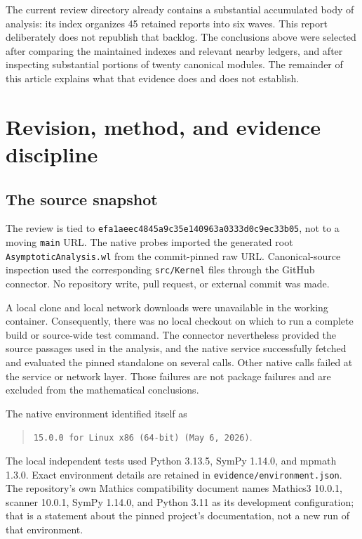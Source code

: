 \documentclass[11pt,a4paper]{article}
\newcommand{\code}[1]{\nolinkurl{#1}}
\newcommand{\commit}{\texttt{efa1aeec4845a9c35e140963a0333d0c9ec33b05}}
\begin{document}
The current review directory already contains a substantial accumulated body
of analysis: its index organizes 45 retained reports into six waves. This
report deliberately does not republish that backlog. The conclusions above
were selected after comparing the maintained indexes and relevant nearby
ledgers, and after inspecting substantial portions of twenty canonical
modules. The remainder of this article explains what that evidence does and
does not establish.\cite{reviewindex}

\section{Revision, method, and evidence discipline}

\subsection{The source snapshot}

The review is tied to \commit, not to a moving \code{main} URL.
The native probes imported the generated root \code{AsymptoticAnalysis.wl}
from the commit-pinned raw URL. Canonical-source inspection used the
corresponding \code{src/Kernel} files through the GitHub connector.
No repository write, pull request, or external commit was made.

A local clone and local network downloads were unavailable in the working
container. Consequently, there was no local checkout on which to run a complete
build or source-wide test command. The connector nevertheless provided the
source passages used in the analysis, and the native service successfully
fetched and evaluated the pinned standalone on several calls. Other native
calls failed at the service or network layer. Those failures are not package
failures and are excluded from the mathematical conclusions.

The native environment identified itself as
\begin{quote}\small
\code{15.0.0 for Linux x86 (64-bit) (May 6, 2026)}.
\end{quote}
The local independent tests used Python 3.13.5, SymPy 1.14.0, and mpmath 1.3.0.
Exact environment details are retained in \code{evidence/environment.json}.
The repository's own Mathics compatibility document names Mathics3 10.0.1,
scanner 10.0.1, SymPy 1.14.0, and Python 3.11 as its development configuration;
that is a statement about the pinned project's documentation, not a new run
of that environment.\cite{mathicsguide}
\end{document}

